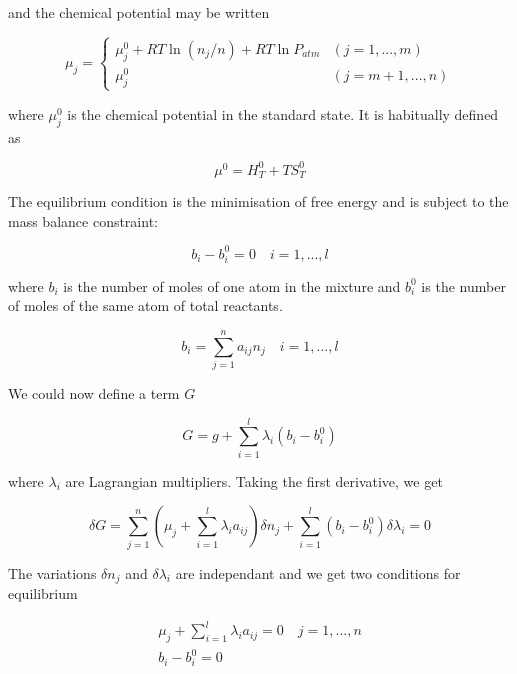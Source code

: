 \documentclass[10pt]{article}
\begin{document}
and the chemical potential may be written

\begin{equation}
\mu_j = 
    \begin{cases}
	\mu_j^0 + RT\ln{(n_j/n)} + RT\ln{P_{atm}}& (j=1,...,m)\\
	\mu_j^0& (j=m+1,...,n)
    \end{cases}
\end{equation}

where $\mu_j^0$ is the chemical potential in the standard state. It is
habitually defined  as

\begin{equation}
\mu^0 = H_T^0 + TS_T^0
\end{equation}

The equilibrium condition is the minimisation of free energy and is
subject to the mass balance constraint:

	\begin{equation}
	b_i - b_i^0 = 0 \quad i = 1,...,l
	\end{equation}

where $b_i$ is the number of moles of one atom in the mixture and
$b_i^0$ is the number of moles of the same atom of total reactants.
	
	\begin{equation}
	b_i = \sum_{j=1}^{n}{a_{ij} n_j} \quad i = 1,...,l
	\end{equation}

 
We could now define a term $G$

	\begin{equation}
	G = g + \sum_{i=1}^{l}{\lambda_i (b_i - b_i^0)}
	\end{equation}

where $\lambda_i$ are Lagrangian multipliers. Taking the first
derivative, we get

\begin{equation}
\delta G = \sum_{j=1}^{n}{\left(\mu_j + \sum_{i=1}^{l}{\lambda_i
a_{ij}}\right)\delta n_j} + \sum_{i=1}^{l}{(b_i - b_i^0)\delta \lambda_i}=0
\end{equation}


The variations $\delta n_j$ and $\delta \lambda_i$ are independant and
we get two conditions for equilibrium

\begin{gather}
\mu_j + \sum_{i=1}^{l}{\lambda_i a_{ij}} = 0 \quad j = 1,...,n \\
b_i - b_i^0 = 0
\end{gather}
\end{document}
